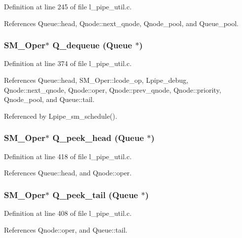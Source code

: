 Definition at line 245 of file l\_\-pipe\_\-util.c.

References Queue::head, Qnode::next\_\-qnode, Qnode\_\-pool, and Queue\_\-pool.
\subsubsection{\setlength{\rightskip}{0pt plus 5cm}\bf{SM\_\-Oper}$\ast$ Q\_\-dequeue (\bf{Queue} $\ast$)}\label{l__pipe__util_8h_7b9451e5338281ce08f9f3900b0da2aa}




Definition at line 374 of file l\_\-pipe\_\-util.c.

References Queue::head, SM\_\-Oper::lcode\_\-op, Lpipe\_\-debug, Qnode::next\_\-qnode, Qnode::oper, Qnode::prev\_\-qnode, Qnode::priority, Qnode\_\-pool, and Queue::tail.

Referenced by Lpipe\_\-sm\_\-schedule().
\subsubsection{\setlength{\rightskip}{0pt plus 5cm}\bf{SM\_\-Oper}$\ast$ Q\_\-peek\_\-head (\bf{Queue} $\ast$)}\label{l__pipe__util_8h_17f2ed633a7771cbc82b5df1aea6c12d}




Definition at line 418 of file l\_\-pipe\_\-util.c.

References Queue::head, and Qnode::oper.
\subsubsection{\setlength{\rightskip}{0pt plus 5cm}\bf{SM\_\-Oper}$\ast$ Q\_\-peek\_\-tail (\bf{Queue} $\ast$)}\label{l__pipe__util_8h_1246c0756b8a3deb050a6bd75d6e5fa1}




Definition at line 408 of file l\_\-pipe\_\-util.c.

References Qnode::oper, and Queue::tail.
